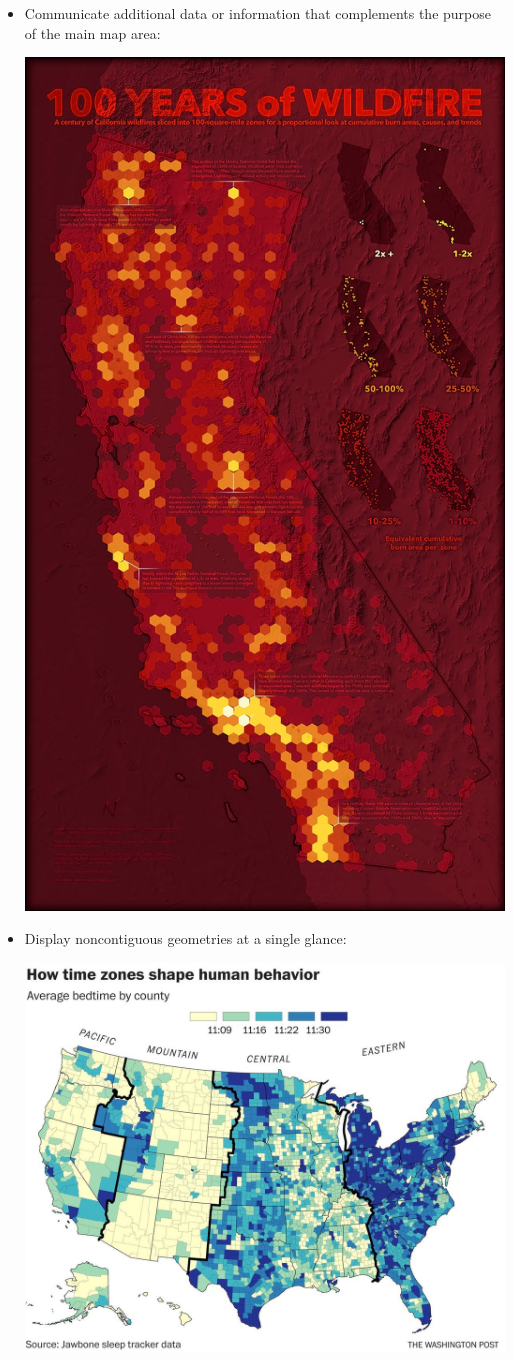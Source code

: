 \documentclass[oneside,a4paper,11pt,explicit]{book}
\begin{document}
\begin{tcolorbox}[enhanced jigsaw,breakable,pad at break*=1mm,
  colback=blue!5!white,colframe=blue!75!black,title=Inset Maps]
\begin{itemize}
         \item Communicate additional data or information that complements the purpose of the main map area:

         \vspace{.25em}

         \centerline{\includegraphics[width=.5\textwidth]{inset-multiples.jpg}}

         \item Display noncontiguous geometries at a single glance:

         \vspace{.25em}

         \centerline{\includegraphics[width=.65\textwidth]{inset-noncontiguous.jpg}}
    \end{itemize}
\end{tcolorbox}
\end{document}
